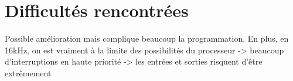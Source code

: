 \documentclass{article}
\begin{document}
    \newpage
    \section{Difficultés rencontrées}








    Possible amélioration mais complique beaucoup la programmation. En plus, en 16kHz, on est vraiment à la limite des possibilités du processeur -> beaucoup d'interruptions en haute priorité -> les entrées et sorties risquent d'être extrêmement
\end{document}
